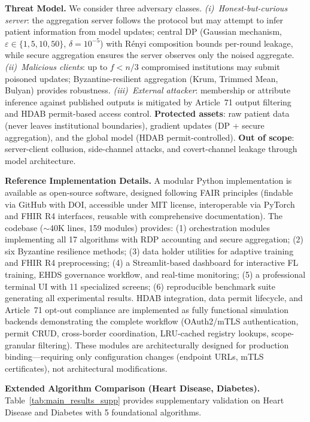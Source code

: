 \documentclass[conference,a4paper]{IEEEtran}
\begin{document}
\smallskip\noindent\textbf{Threat Model.}
We consider three adversary classes. \textit{(i)~Honest-but-curious server}: the aggregation server follows the protocol but may attempt to infer patient information from model updates; central DP (Gaussian mechanism, $\varepsilon \in \{1{,}5{,}10{,}50\}$, $\delta{=}10^{-5}$) with R\'{e}nyi composition bounds per-round leakage, while secure aggregation ensures the server observes only the noised aggregate. \textit{(ii)~Malicious clients}: up to $f < n/3$ compromised institutions may submit poisoned updates; Byzantine-resilient aggregation (Krum, Trimmed Mean, Bulyan) provides robustness. \textit{(iii)~External attacker}: membership or attribute inference against published outputs is mitigated by Article~71 output filtering and HDAB permit-based access control. \textbf{Protected assets}: raw patient data (never leaves institutional boundaries), gradient updates (DP + secure aggregation), and the global model (HDAB permit-controlled). \textbf{Out of scope}: server-client collusion, side-channel attacks, and covert-channel leakage through model architecture.

\smallskip\noindent\textbf{Reference Implementation Details.}
A modular Python implementation is available as open-source software, designed following FAIR principles (findable via GitHub with DOI, accessible under MIT license, interoperable via PyTorch and FHIR R4 interfaces, reusable with comprehensive documentation). The codebase ($\sim$40K lines, 159 modules) provides: (1) orchestration modules implementing all 17 algorithms with RDP accounting and secure aggregation; (2) six Byzantine resilience methods; (3) data holder utilities for adaptive training and FHIR R4 preprocessing; (4) a Streamlit-based dashboard for interactive FL training, EHDS governance workflow, and real-time monitoring; (5) a professional terminal UI with 11 specialized screens; (6) reproducible benchmark suite generating all experimental results. HDAB integration, data permit lifecycle, and Article~71 opt-out compliance are implemented as fully functional simulation backends demonstrating the complete workflow (OAuth2/mTLS authentication, permit CRUD, cross-border coordination, LRU-cached registry lookups, scope-granular filtering). These modules are architecturally designed for production binding---requiring only configuration changes (endpoint URLs, mTLS certificates), not architectural modifications.

\smallskip\noindent\textbf{Extended Algorithm Comparison (Heart Disease, Diabetes).}
Table~\ref{tab:main_results_supp} provides supplementary validation on Heart Disease and Diabetes with 5 foundational algorithms.
\end{document}
